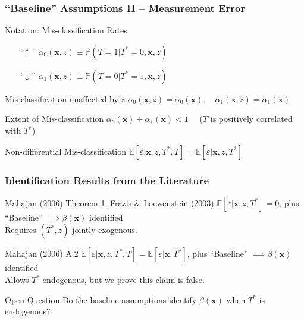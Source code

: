 \documentclass{beamer}
\begin{document}
\begin{frame}
  \frametitle{``Baseline'' Assumptions II -- Measurement Error}


  \begin{alertblock}{Notation: Mis-classification Rates}
    \begin{itemize}
      \item[``$\boldsymbol{\uparrow}$''] 
    $\alpha_0(\mathbf{x},z) \equiv \mathbb{P}\left(T=1|T^*=0,\mathbf{x},z  \right)$
  \item[``$\boldsymbol{\downarrow}$''] 
  $\alpha_1(\mathbf{x},z) \equiv \mathbb{P}\left(T=0|T^*=1,\mathbf{x},z  \right)$
    \end{itemize}
  \end{alertblock}

  \begin{block}{Mis-classification unaffected by $z$}
    $\alpha_0(\mathbf{x},z) = \alpha_0(\mathbf{x}), \quad   \alpha_1(\mathbf{x},z) = \alpha_1(\mathbf{x})$
  \end{block}

  \begin{block}{Extent of Mis-classification}
      $\alpha_0(\mathbf{x}) + \alpha_1(\mathbf{x}) < 1 \quad$ ($T$ is positively correlated with $T^*$)
  \end{block}

  \begin{block}{Non-differential Mis-classification}
     $\mathbb{E}[\varepsilon|\mathbf{x},z,T^*,T] = \mathbb{E}[\varepsilon|\mathbf{x},z, T^*]$
  \end{block}



\end{frame}
\begin{frame}
  \frametitle{Identification Results from the Literature}

  \begin{block}{Mahajan (2006) Theorem 1, Frazis \& Loewenstein (2003)}
    $\mathbb{E}[\varepsilon|\mathbf{x},z,T^*] = 0$, plus ``Baseline'' $\implies \beta(\mathbf{x})$ identified\\
   \hfill \alert{Requires $(T^*,z)$ jointly exogenous.}
  \end{block}

  \begin{block}{Mahajan (2006) A.2}
    $\mathbb{E}[\varepsilon|\mathbf{x}, z, T^*, T] = \mathbb{E}[\varepsilon|\mathbf{x},T^*]$, plus ``Baseline'' $\implies \beta(\mathbf{x})$ identified\\
    \hfill \alert{Allows $T^*$ endogenous, but we prove this claim is false.}
  \end{block}


  \begin{block}{Open Question}
    Do the baseline assumptions identify $\beta(\mathbf{x})$ when $T^*$ is endogenous?
  \end{block}

\end{frame}
\end{document}
